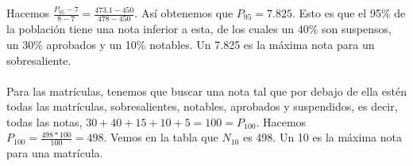 \documentclass{article}
\begin{document}
    Hacemos $\frac{P_{95}-7}{8-7}=\frac{473.1-450}{478-450}$. Así obtenemos que $P_{95} = 7.825$. Esto es que el 95\% de la población tiene una nota inferior a esta, de los cuales un 40\% son suspensos, un 30\% aprobados y un 10\% notables. Un 7.825 es la máxima nota para un sobresaliente. \\ \\
    Para las matrículas, tenemos que buscar una nota tal que por debajo de ella estén todas las matrículas, sobresalientes, notables, aprobados y suspendidos, es decir, todas las notas, $30+40+15+10+5 = 100 = P_{100}$. Hacemos $P_{100}=\frac{498*100}{100}=498$. Vemos en la tabla que $N_{10}$ es 498. Un 10 es la máxima nota para una matrícula.
\end{document}
